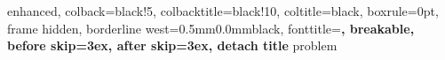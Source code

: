 \usepackage{titlesec}
\usepackage[many]{tcolorbox}

\titlespacing*{\chapter}{0cm}{-2.0cm}{0.50cm}
\titlespacing*{\section}{0cm}{0.50cm}{0.25cm}

\setlength{\parindent}{0pt}
\setlength{\parskip}{1ex}


%
{enhanced,
	colback=black!5,
	colbacktitle=black!10,
	coltitle=black,
	boxrule=0pt,
	frame hidden,
	borderline west={0.5mm}{0.0mm}{black},
	fonttitle=\bfseries\sffamily,
	breakable,
	before skip=3ex,
	after skip=3ex,
	detach title
}{problem}


